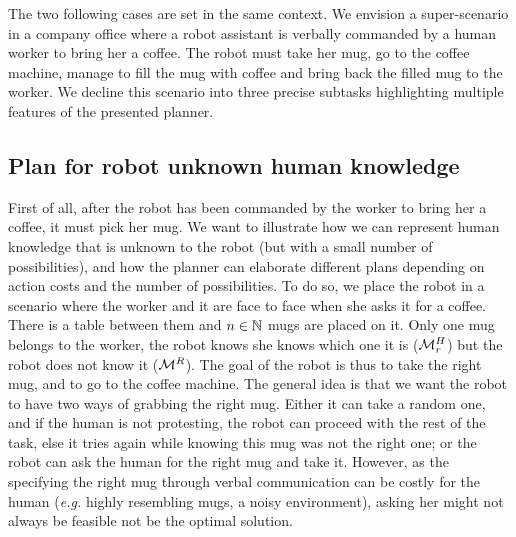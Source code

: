 \documentclass[a4paper,11pt,twoside]{StyleThese}
\begin{document}
The two following cases are set in the same context. We envision a super-scenario in a company office where a robot assistant is verbally commanded by a human worker to bring her a coffee. The robot must take her mug, go to the coffee machine, manage to fill the mug with coffee and bring back the filled mug to the worker.
We decline this scenario into three precise subtasks highlighting multiple features of the presented planner.
\subsection{Plan for robot unknown human knowledge}
First of all, after the robot has been commanded by the worker to bring her a coffee, it must pick her mug. We want to illustrate how we can represent human knowledge that is unknown to the robot (but with a small number of possibilities), and how the planner can elaborate different plans depending on action costs and the number of possibilities. To do so, we place the robot in a scenario where the worker and it are face to face when she asks it for a coffee. There is a table between them and $n \in \mathbb{N}$ mugs are placed on it. Only one mug belongs to the worker, the robot knows she knows which one it is ($\mathcal{M}^H_r$) but the robot does not know it ($\mathcal{M}^R$). The goal of the robot is thus to take the right mug, and to go to the coffee machine. The general idea is that we want the robot to have two ways of grabbing the right mug. Either it can take a random one, and if the human is not protesting, the robot can proceed with the rest of the task, else it tries again while knowing this mug was not the right one; or the robot can ask the human for the right mug and take it. However, as the specifying the right mug through verbal communication can be costly for the human (\textit{e.g.} highly resembling mugs, a noisy environment), asking her might not always be feasible not be the optimal solution.
\end{document}
